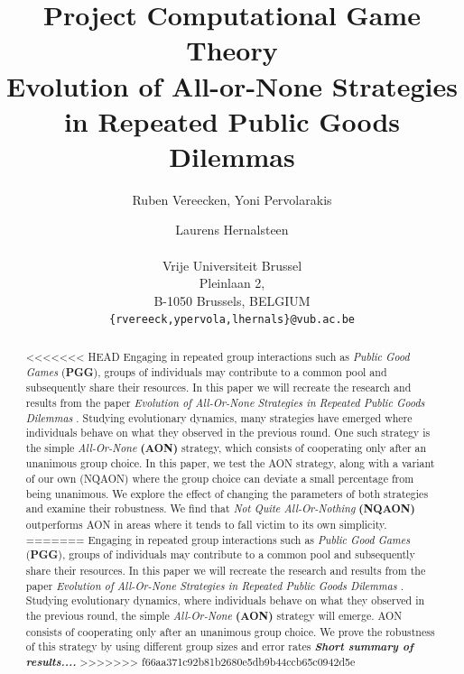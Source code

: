 \documentclass[letterpaper]{article}
\title{Project Computational Game Theory\\Evolution of All-or-None Strategies in Repeated Public Goods Dilemmas}
\author{Ruben Vereecken, Yoni Pervolarakis \and Laurens Hernalsteen \\
\mbox{}\\Vrije Universiteit Brussel \\Pleinlaan 2, \\B-1050 Brussels, BELGIUM\\
{\texttt{\{rvereeck,ypervola,lhernals\}@vub.ac.be}}}
\begin{document}
\maketitle

\begin{abstract}
<<<<<<< HEAD
Engaging in repeated group interactions such as  \textit{Public Good Games}  (\textbf{PGG}), groups of individuals may contribute to a
common pool and subsequently share their resources. In this
paper we will recreate the research and results from the paper
\textit{Evolution of All-Or-None Strategies in Repeated Public Goods Dilemmas}  \citep{project}. Studying evolutionary dynamics, many strategies have emerged where individuals behave on what they observed in the previous round. One such strategy is the simple \textit{All-Or-None} \textbf{(AON)} strategy, which consists of cooperating only after an unanimous group choice. In this paper, we test the AON strategy, along with a variant of our own (NQAON) where the group choice can deviate a small percentage from being unanimous. We explore the effect of changing the parameters of both strategies and examine their robustness. We find that \textit{Not Quite All-Or-Nothing} \textbf{(NQAON)} outperforms AON in areas where it tends to fall victim to its own simplicity.
=======
Engaging in repeated group interactions such as \textit{Public Good Games}  (\textbf{PGG}), groups of individuals may contribute to a common pool and subsequently share their resources. In this paper we will recreate the research and results from the paper  \textit{Evolution of All-Or-None Strategies in Repeated Public Goods Dilemmas}  \citep{project}. Studying evolutionary dynamics, where individuals behave on what they observed in the previous round, the simple \textit{All-Or-None} \textbf{(AON)} strategy  will emerge. AON consists of cooperating only after an unanimous group choice. We prove the robustness of this strategy by using different group sizes and error rates
\textit{\textbf{Short summary of results....}}
>>>>>>> f66aa371c92b81b2680e5db9b44ccb65c0942d5e


\end{abstract}
\end{document}
